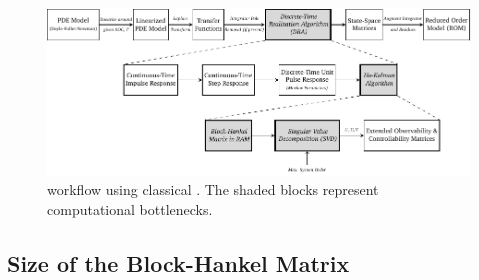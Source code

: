 \begin{figure}[!htbp]
    \centering
    \includegraphics[width=\textwidth]{chapters/dra/figures/traditional_dra.pdf}
    \caption[%
     workflow using the classical  scheme
    ]%
    {%
         workflow using classical
        . The shaded blocks represent computational bottlenecks.
    }%
    \label{fig:traditional_ROM_Workflow}
\end{figure}

\subsection{Size of the Block-Hankel Matrix}\label{sec:size-of-the}

